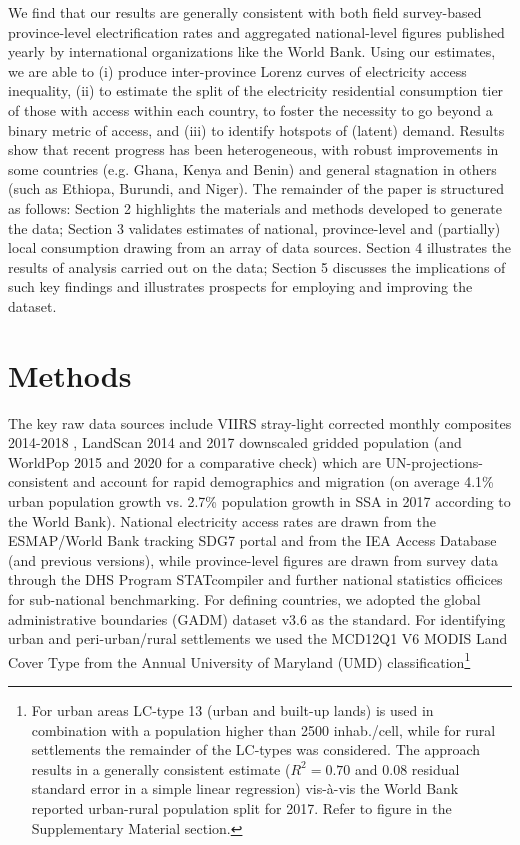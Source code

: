 \documentclass[preprint,12pt]{elsarticle}
\begin{document}
We find that our results are generally consistent with both field survey-based province-level electrification rates and aggregated national-level figures published yearly by international organizations like the World Bank. Using our estimates, we are able to (i) produce inter-province Lorenz curves of electricity access inequality, (ii) to estimate the split of the electricity residential consumption tier of those with access within each country, to foster the necessity to go beyond a binary metric of access, and (iii) to identify hotspots of (latent) demand. Results show that recent progress has been heterogeneous, with robust improvements in some countries (e.g. Ghana, Kenya and Benin) and general stagnation in others (such as Ethiopa, Burundi, and Niger). The remainder of the paper is structured as follows: Section 2 highlights the materials and methods developed to generate the data; Section 3 validates estimates of national, province-level and (partially) local consumption drawing from an array of data sources. Section 4 illustrates the results of analysis carried out on the data; Section 5 discusses the implications of such key findings and illustrates prospects for employing and improving the dataset. 

\section{Methods}
The key raw data sources include VIIRS stray-light corrected monthly composites 2014-2018 \citep{baugh2013nighttime}, LandScan 2014 and 2017 downscaled gridded population \citep{dobson2000landscan} (and WorldPop 2015 and 2020 \citep{tatem2017worldpop} for a comparative check) which are UN-projections-consistent and account  for rapid demographics and migration (on average 4.1\% urban population growth vs. 2.7\% population growth in SSA in 2017 according to the World Bank). National electricity access rates are drawn from the ESMAP/World Bank tracking SDG7 portal \citep{banerjee2013global} and from the IEA Access Database \citep{iea_world_2018} (and previous versions), while province-level figures are drawn from survey data through the DHS Program STATcompiler and further national statistics officices for sub-national benchmarking. For defining countries, we adopted the global administrative boundaries (GADM) dataset v3.6 as the standard. For identifying urban and peri-urban/rural settlements we used the MCD12Q1 V6 MODIS Land Cover Type \citep{friedl2015mcd12q1} from the Annual University of Maryland (UMD) classification\footnote{For urban areas LC-type 13 (urban and built-up lands) is used in combination with a population higher than 2500 inhab./cell, while for rural settlements the remainder of the LC-types was considered. The approach results in a generally consistent estimate ($R^2 = 0.70$ and 0.08 residual standard error in a simple linear regression) vis-à-vis the World Bank reported urban-rural population split for 2017. Refer to figure in the Supplementary Material section.} 
\end{document}

